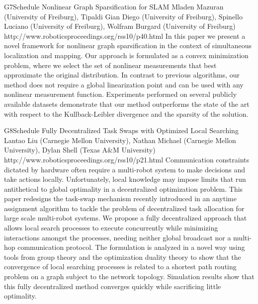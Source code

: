 \begin{spacing}{1.0}
\descriptionPaper
{G7}{Schedule}
{	
Nonlinear Graph Sparsification for SLAM
}
{
Mladen Mazuran (University of Freiburg), Tipaldi Gian Diego (University of Freiburg), Spinello Luciano (University of Freiburg), Wolfram Burgard (University of Freiburg)
}
{
http://www.roboticsproceedings.org/rss10/p40.html
}
{
In this paper we present a novel framework for nonlinear graph sparsification in the context of simultaneous localization and mapping. Our approach is formulated as a convex minimization problem, where we select the set of nonlinear measurements that best approximate the original distribution. In contrast to previous algorithms, our method does not require a global linearization point and can be used with any nonlinear measurement function. Experiments performed on several publicly available datasets demonstrate that our method outperforms the state of the art with respect to the Kullback-Leibler divergence and the sparsity of the solution.
}


\descriptionPaper
{G8}{Schedule}
{	
Fully Decentralized Task Swaps with Optimized Local Searching
}
{
Lantao Liu (Carnegie Mellon University), Nathan Michael (Carnegie Mellon University), Dylan Shell (Texas A\&M University)
}
{
http://www.roboticsproceedings.org/rss10/p21.html
}
{
Communication constraints dictated by hardware often require a multi-robot system to make decisions and take actions locally. Unfortunately, local knowledge may impose limits that run antithetical to global optimality in a decentralized optimization problem. This paper redesigns the task-swap mechanism recently introduced in an anytime assignment algorithm to tackle the problem of decentralized task allocation for large scale multi-robot systems. We propose a fully decentralized approach that allows local search processes to execute concurrently while minimizing interactions amongst the processes, needing neither global broadcast nor a multi-hop communication protocol. The formulation is analyzed in a novel way using tools from group theory and the optimization duality theory to show that the convergence of local searching processes is related to a shortest path routing problem on a graph subject to the network topology. Simulation results show that this fully decentralized method converges quickly while sacrificing little optimality.
}





\end{spacing}
